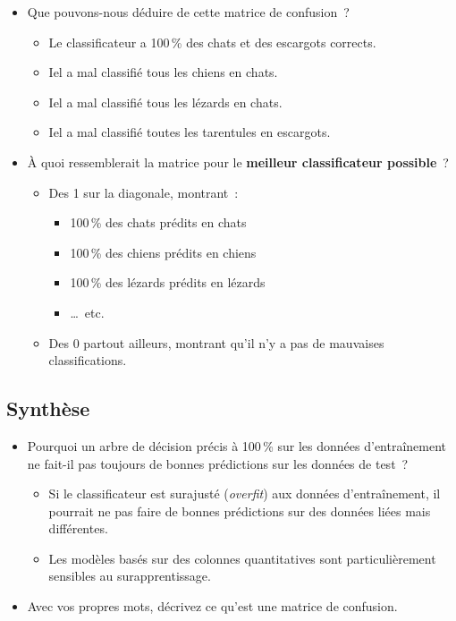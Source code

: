 \documentclass[12pt,a4paper]{article}
\begin{document}
\begin{thinkbox}
  \begin{itemize}
    \item Que pouvons-nous déduire de cette matrice de confusion~?
    \begin{itemize}
      \item Le classificateur a 100\,\% des chats et des escargots corrects.
      \item Iel a mal classifié tous les chiens en chats.
      \item Iel a mal classifié tous les lézards en chats.
      \item Iel a mal classifié toutes les tarentules en escargots.
    \end{itemize}
    \item À quoi ressemblerait la matrice pour le \textbf{meilleur classificateur possible}~?
    \begin{itemize}
      \item Des 1 sur la diagonale, montrant~:
      \begin{itemize}
        \item 100\,\% des chats prédits en chats
        \item 100\,\% des chiens prédits en chiens
        \item 100\,\% des lézards prédits en lézards
        \item …~etc.
      \end{itemize}
      \item Des 0 partout ailleurs, montrant qu'il n'y a pas de mauvaises classifications.
    \end{itemize}
  \end{itemize}
\end{thinkbox}

\subsection{Synthèse}

\begin{thinkbox}
  \begin{itemize}
    \item Pourquoi un arbre de décision précis à 100\,\% sur les données d'entraînement ne fait-il pas toujours de bonnes prédictions sur les données de test~?
    \begin{itemize}
      \item Si le classificateur est surajusté (\emph{overfit}) aux données d'entraînement, il pourrait ne pas faire de bonnes prédictions sur des données liées mais différentes.
      \item Les modèles basés sur des colonnes quantitatives sont particulièrement sensibles au surapprentissage.
    \end{itemize}
    \item Avec vos propres mots, décrivez ce qu'est une matrice de confusion.
  \end{itemize}
\end{thinkbox}
\end{document}
